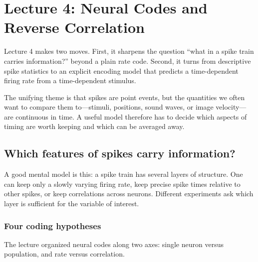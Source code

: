 \section{Lecture 4: Neural Codes and Reverse Correlation}
\label{sec:aand-spikes-lecture-4}

Lecture 4 makes two moves. First, it sharpens the question ``what in a spike train carries information?'' beyond a plain rate code. Second, it turns from descriptive spike statistics to an explicit encoding model that predicts a time-dependent firing rate from a time-dependent stimulus.

The unifying theme is that spikes are point events, but the quantities we often want to compare them to---stimuli, positions, sound waves, or image velocity---are continuous in time. A useful model therefore has to decide which aspects of timing are worth keeping and which can be averaged away.

\subsection{Which features of spikes carry information?}

A good mental model is this: a spike train has several layers of structure. One can keep only a slowly varying firing rate, keep precise spike times relative to other spikes, or keep correlations across neurons. Different experiments ask which layer is sufficient for the variable of interest.

\subsubsection{Four coding hypotheses}

The lecture organized neural codes along two axes: single neuron versus population, and rate versus correlation.

